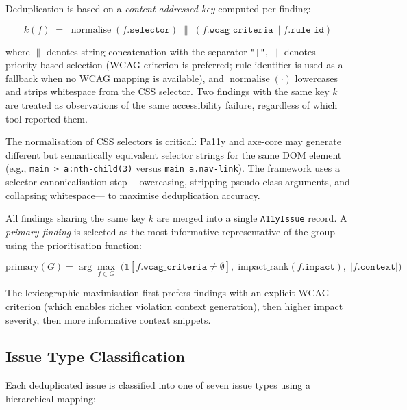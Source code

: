 Deduplication is based on a \emph{content-addressed key} computed per finding:

\begin{equation}
  k(f) \;=\; \operatorname{normalise}\!\left(f.\texttt{selector}\right)
  \;\|\;
  \left(f.\texttt{wcag\_criteria} \parallel f.\texttt{rule\_id}\right)
  \label{eq:dedup_key}
\end{equation}

\noindent
where $\|$ denotes string concatenation with the separator \texttt{"|"},
$\parallel$ denotes priority-based selection (WCAG criterion is preferred;
rule identifier is used as a fallback when no WCAG mapping is available),
and $\operatorname{normalise}(\cdot)$ lowercases and strips whitespace from
the CSS selector.  Two findings with the same key $k$ are treated as
observations of the same accessibility failure, regardless of which tool
reported them.

The normalisation of CSS selectors is critical: Pa11y and axe-core may
generate different but semantically equivalent selector strings for the same
DOM element (e.g., \texttt{main > a:nth-child(3)} versus
\texttt{main~a.nav-link}).  The framework uses a selector canonicalisation
step—lowercasing, stripping pseudo-class arguments, and collapsing whitespace—
to maximise deduplication accuracy.

All findings sharing the same key $k$ are merged into a single
\texttt{A11yIssue} record.  A \emph{primary finding} is selected as the most
informative representative of the group using the prioritisation function:

\begin{equation}
  \text{primary}(G) = \arg\max_{f \in G}\;
    \Big( \mathbb{1}[f.\texttt{wcag\_criteria} \neq \emptyset],\;
          \text{impact\_rank}(f.\texttt{impact}),\;
          \left|f.\texttt{context}\right| \Big)
  \label{eq:primary}
\end{equation}

\noindent
The lexicographic maximisation first prefers findings with an explicit WCAG
criterion (which enables richer violation context generation), then higher
impact severity, then more informative context snippets.

\subsection{Issue Type Classification}

Each deduplicated issue is classified into one of seven issue types using a
hierarchical mapping:

